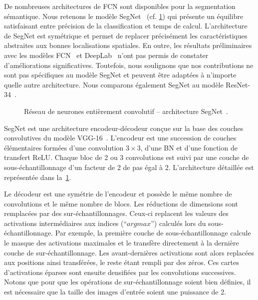 
De nombreuses architectures de \gls{FCN} sont disponibles pour la segmentation sémantique. Nous retenons le modèle SegNet~\cite{badrinarayanan_segnet_2017} (cf. \cref{fig:segnet}) qui présente un équilibre satisfaisant entre précision de la classification et temps de calcul. L'architecture de SegNet est symétrique et permet de replacer précisément les caractéristiques abstraites aux bonnes localisations spatiales. En outre, les résultats préliminaires avec les modèles \gls{FCN}~\cite{long_fully_2015} et DeepLab~\cite{chen_deeplab_2018} n'ont pas permis de constater d'améliorations significatives. Toutefois, nous soulignons que nos contributions ne sont pas spécifiques au modèle SegNet et peuvent être adaptées à n'importe quelle autre architecture. Nous comparons également SegNet au modèle ResNet-34~\cite{he_deep_2016}.

\begin{figure}
	\resizebox{\textwidth}{!}{%
	
	}
	\caption[Réseau de neurones entièrement convolutif -- architecture SegNet.]{Réseau de neurones entièrement convolutif -- architecture SegNet~\cite{badrinarayanan_segnet_2017}.}
	\label{fig:segnet}
\end{figure}

SegNet est une architecture encodeur-décodeur conçue sur la base des couches convolutives du modèle VGG-16~\cite{chatfield_return_2014,simonyan_very_2014}. L'encodeur est une succession de couches élémentaires formées d'une convolution $3\times3$, d'une \gls{BN} et d'une fonction de transfert \gls{ReLU}. Chaque bloc de 2 ou 3 convolutions est suivi par une couche de sous-échantillonnage d'un facteur de 2 de pas égal à 2. L'architecture détaillée est représentée dans la~\cref{fig:segnet}.

% 

Le décodeur est une symétrie de l'encodeur et possède le même nombre de convolutions et le même nombre de blocs. Les réductions de dimensions sont remplacées par des sur-échantillonnages. Ceux-ci replacent les valeurs des activations intermédiaires aux indices (``$argmax$'') calculés lors du sous-échantillonnage. Par exemple, la première couche de sous-échantillonnage calcule le masque des activations maximales et le transfère directement à la dernière couche de sur-échantillonnage. Les avant-dernières activations sont alors replacées aux positions ainsi transférées, le reste étant rempli par des zéros. Ces cartes d'activations éparses sont ensuite densifiées par les convolutions successives. Notons que pour que les opérations de sur-échantillonnage soient bien définies, il est nécessaire que la taille des images d'entrée soient une puissance de 2.

